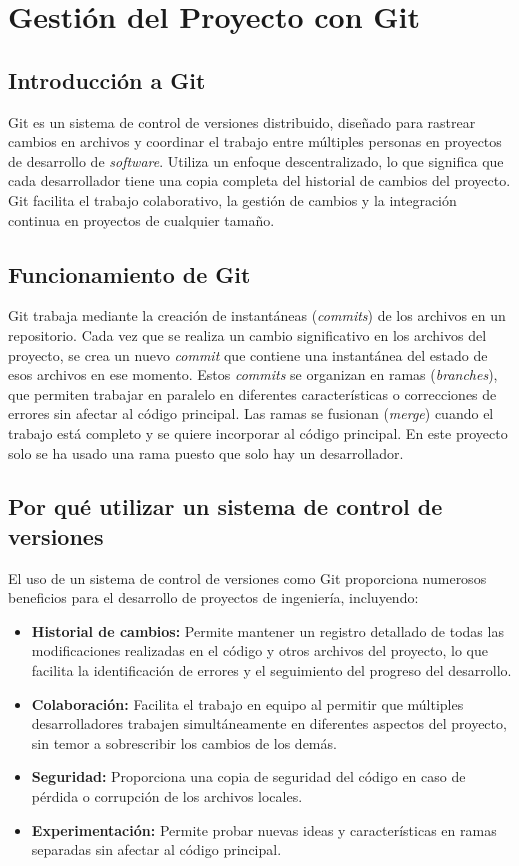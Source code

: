 \section{Gestión del Proyecto con Git}
\subsection{Introducción a Git}
Git es un sistema de control de versiones distribuido, diseñado para rastrear cambios en archivos y coordinar el trabajo entre múltiples personas en proyectos de desarrollo de \textit{software}. Utiliza un enfoque descentralizado, lo que significa que cada desarrollador tiene una copia completa del historial de cambios del proyecto. Git facilita el trabajo colaborativo, la gestión de cambios y la integración continua en proyectos de cualquier tamaño.

\subsection{Funcionamiento de Git}
Git trabaja mediante la creación de instantáneas (\textit{commits}) de los archivos en un repositorio. Cada vez que se realiza un cambio significativo en los archivos del proyecto, se crea un nuevo \textit{commit} que contiene una instantánea del estado de esos archivos en ese momento. Estos \textit{commits} se organizan en ramas (\textit{branches}), que permiten trabajar en paralelo en diferentes características o correcciones de errores sin afectar al código principal. Las ramas se fusionan (\textit{merge}) cuando el trabajo está completo y se quiere incorporar al código principal. En este proyecto solo se ha usado una rama puesto que solo hay un desarrollador.

\subsection{Por qué utilizar un sistema de control de versiones}
El uso de un sistema de control de versiones como Git proporciona numerosos beneficios para el desarrollo de proyectos de ingeniería, incluyendo:

\begin{itemize}
	\item \textbf{Historial de cambios:} Permite mantener un registro detallado de todas las modificaciones realizadas en el código y otros archivos del proyecto, lo que facilita la identificación de errores y el seguimiento del progreso del desarrollo.
	\item \textbf{Colaboración:} Facilita el trabajo en equipo al permitir que múltiples desarrolladores trabajen simultáneamente en diferentes aspectos del proyecto, sin temor a sobrescribir los cambios de los demás.
	\item \textbf{Seguridad:} Proporciona una copia de seguridad del código en caso de pérdida o corrupción de los archivos locales.
	\item \textbf{Experimentación:} Permite probar nuevas ideas y características en ramas separadas sin afectar al código principal.
\end{itemize}

